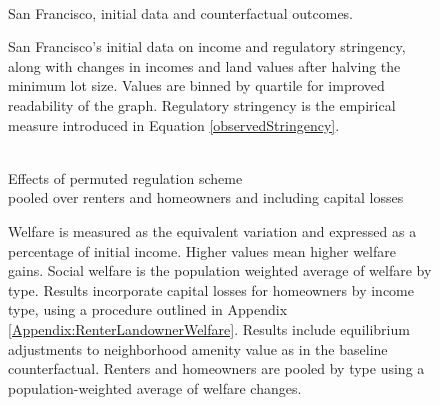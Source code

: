 \documentclass[12pt]{article}
\begin{document}
	\clearpage
	
	\begin{figure}\caption{ \\ San Francisco, initial data and counterfactual outcomes.}\label{figure:SF_ctfl}
	
	\caption*{San Francisco's initial data on income and regulatory stringency, along with changes in incomes and land values after halving the minimum lot size. Values are binned by quartile for improved readability of the graph. Regulatory stringency is the empirical measure introduced in Equation \eqref{observedStringency}.}
		
	\end{figure}
	
	
	
	\begin{figure}[htbp!]
		\begin{center}
			\caption{ \\ Effects of permuted regulation scheme \\ pooled over renters and homeowners and including capital losses }\label{figure:pooledWelfare_optPolicy}
		\end{center}
			\caption*{Welfare is measured as the equivalent variation and expressed as a percentage of initial income. Higher values mean higher welfare gains. Social welfare is the population weighted average of welfare by type. Results incorporate capital losses for homeowners by income type, using a procedure outlined in Appendix \ref{Appendix:RenterLandownerWelfare}. Results include equilibrium adjustments to neighborhood amenity value as in the baseline counterfactual. Renters and homeowners are pooled by type using a population-weighted average of welfare changes.}
		\end{figure}
		
\end{document}
